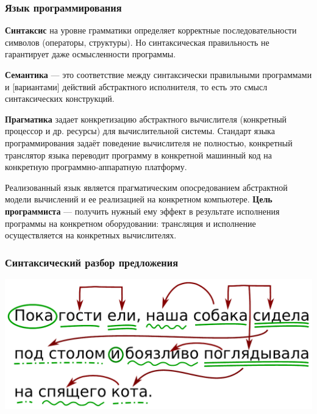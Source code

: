 \documentclass[10pt]{beamer}
\begin{document}
\begin{frame}
  \frametitle{Язык программирования}
\textbf{Синтаксис} на уровне грамматики определяет корректные последовательности символов (операторы, структуры). Но синтаксическая правильность не гарантирует даже осмысленности программы. %

\textbf{Семантика} — это соответствие между синтаксически правильными программами и [вариантами] действий абстрактного исполнителя, то есть это смысл синтаксических конструкций.

\textbf{Прагматика} задает конкретизацию абстрактного вычислителя (конкретный процессор и др. ресурсы) для  вычислительной системы. Стандарт языка программирования задаёт поведение вычислителя не полностью, конкретный транслятор языка переводит программу в конкретной машинный код на конкретную программно-аппаратную платформу.

Реализованный язык является прагматическим опосредованием абстрактной модели вычислений и ее реализацией на конкретном компьютере.
\vfill
\textbf{Цель программиста} — получить нужный ему эффект в результате исполнения программы на конкретном оборудовании: трансляция и исполнение осуществляется на конкретных вычислителях.

\end{frame}

\begin{frame}
  \frametitle{Синтаксический разбор предложения}
  \begin{center}
    \includegraphics[width=1\linewidth]{pics/morphosent.pdf}
  \end{center}
\end{frame}
\end{document}
